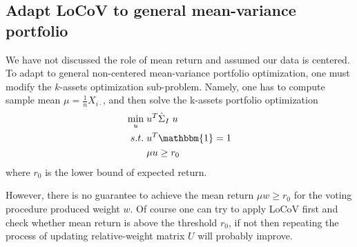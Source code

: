 \documentclass[12pt]{extarticle}
\newcommand{\1}{\mathbbm{1}}
\numberwithin{equation}{section}
\begin{document}
\subsection{Adapt LoCoV to general mean-variance portfolio}
We have not discussed the role of mean return and assumed our data is centered. To adapt to general non-centered mean-variance portfolio optimization, one must modify the $k$-assets optimization sub-problem. Namely, one has to compute sample mean $\mu = \frac{1}{n} X_{i\cdot}$, and then solve the k-assets portfolio optimization
\begin{align*}
    \begin{split}
	\min_u \; & u^T \hat{\Sigma}_{I}\; u \\
	 s.t. \;  & u^T \mathbbm{1} =1 \\
	& \mu u\ge r_0
    \end{split} 
\end{align*}
where $r_0$ is the lower bound of expected return.

However, there is no guarantee to achieve the mean return $\mu w \ge r_0$ for the voting procedure produced weight $w$. Of course one can try to apply LoCoV first and check whether mean return is above the threshold $r_0$, if not then repeating the process of updating relative-weight matrix $U$ will probably improve. 


\medskip



\end{document}
